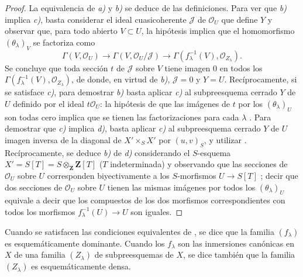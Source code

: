 \begin{proof}
La equivalencia de \emph{a)} y \emph{b)} se deduce de las definiciones.
Para ver que \emph{b)} implica \emph{c)}, basta considerar el ideal cuasicoherente $\mathcal J$ de $\mathcal O_U$ que define $Y$ y observar que, para todo abierto $V\subset U$, la hipótesis implica que el homomorfismo $(\theta_\lambda)_V$ se factoriza como
\[
\Gamma(V,\mathcal O_U)\longrightarrow
\Gamma(V,\mathcal O_U/\mathcal J)\longrightarrow
\Gamma(f_\lambda^{-1}(V),\mathcal O_{Z_\lambda}).
\]
Se concluye que toda sección $t$ de $\mathcal J$ sobre $V$ tiene imagen 0 en todos los $\Gamma(f_\lambda^{-1}(V),\mathcal O_{Z_\lambda})$, de donde, en virtud de \emph{b)}, $\mathcal J=0$ y $Y=U$.
Recíprocamente, si se satisface \emph{c)}, para demostrar \emph{b)} basta aplicar \emph{c)} al subpreesquema cerrado $Y$ de $U$ definido por el ideal $t\mathcal O_U$: la hipótesis de que las imágenes de $t$ por los $(\theta_\lambda)_U$ son todas cero implica que se tienen las factorizaciones  para cada $\lambda$ .
Para demostrar que \emph{c)} implica \emph{d)}, basta aplicar \emph{c)} al subpreesquema cerrado $Y$ de $U$ imagen inversa de la diagonal de $X'\times_SX'$ por $(u,v)_S$, y utilizar .
Recíprocamente, se deduce \emph{b)} de \emph{d)} considerando el $S$-esquema $X'=S[T]=S\otimes_{\mathbf Z}\mathbf Z[T]$ ($T$ indeterminada) y observando que las secciones de $\mathcal O_U$ sobre $U$ corresponden biyectivamente a los $S$-morfismos $U\to S[T]$ ; decir que dos secciones de $\mathcal O_U$ sobre $U$ tienen las mismas imágenes por todos los $(\theta_\lambda)_U$ equivale a decir que los compuestos de los dos morfismos correspondientes con todos los morfismos $f_\lambda^{-1}(U)\to U$ son iguales.
\end{proof}

\begin{definition}[11.10.2]
\label{IV.11.10.2}
Cuando se satisfacen las condiciones equivalentes de , se dice que la familia $(f_\lambda)$ es esquemáticamente dominante.
Cuando los $f_\lambda$ son las inmersiones canónicas en $X$ de una familia $(Z_\lambda)$ de subpreesquemas de $X$, se dice también que la familia $(Z_\lambda)$ es esquemáticamente densa.
\end{definition}

